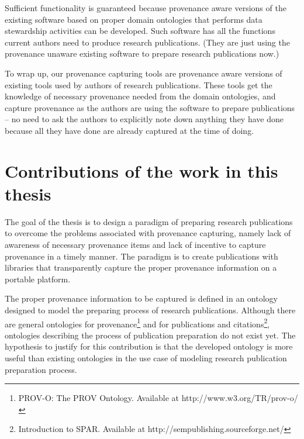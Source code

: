 Sufficient functionality is guaranteed because provenance aware versions of the existing software based on proper domain ontologies that performs data stewardship activities can be developed. Such software has all the functions current authors need to produce research publications. (They are just using the provenance unaware existing software to prepare research publications now.) 

To wrap up, our provenance capturing tools are provenance aware versions of existing tools used by authors of research publications. These tools get the knowledge of necessary provenance needed from the domain ontologies, and capture provenance as the authors are using the software to prepare publications -- no need to ask the authors to explicitly note down anything they have done because all they have done are already captured at the time of doing.

\section{Contributions of the work in this thesis}
\label{sec:contribution}
The goal of the thesis is to design a paradigm of preparing research publications to overcome the problems associated with provenance capturing, namely lack of awareness of necessary provenance items and lack of incentive to capture provenance in a timely manner. The paradigm is to create publications with libraries that transparently capture the proper provenance information on a portable platform.

The proper provenance information to be captured is defined in an ontology designed to model the preparing process of research publications. Although there are general ontologies for provenance\footnote{PROV-O: The PROV Ontology. Available at http://www.w3.org/TR/prov-o/} and for publications and citations\footnote{Introduction to SPAR. Available at http://sempublishing.sourceforge.net/}, ontologies describing the process of publication preparation do not exist yet. The hypothesis to justify for this contribution is that the developed ontology is more useful than existing ontologies in the use case of modeling research publication preparation process.

